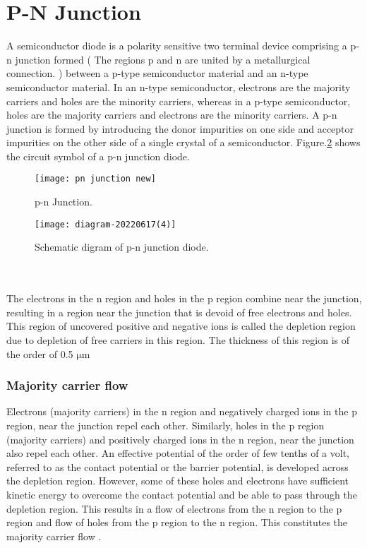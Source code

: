 \section{P-N Junction}
A semiconductor diode is a polarity sensitive two terminal device comprising a p-n junction formed ( The regions p and n are united by a metallurgical connection. ) between a p-type semiconductor material and an n-type semiconductor material. In an n-type semiconductor, electrons are the majority carriers and holes are the minority carriers, whereas in a p-type semiconductor, holes are the majority carriers and electrons are the minority carriers. A p-n junction is formed by introducing the donor impurities on one side and acceptor impurities on the other side of a single crystal of a semiconductor. Figure.\ref{Diode} shows the circuit symbol of a p-n junction diode.\\
\begin{minipage}{0.35\textwidth}
\begin{figure}[H]
	\centering
	\texttt{[image: pn junction new]}
	\caption{p-n Junction.}
	\label{}
\end{figure}
\end{minipage}\hfil
\begin{minipage}{0.55\textwidth}
	\begin{figure}[H]
		\centering
		\texttt{[image: diagram-20220617(4)]}
		\caption{Schematic digram of p-n junction diode.}
		\label{Diode}
	\end{figure}
\end{minipage}\\\\
The electrons in the n region and holes in the p region combine near the junction, resulting in a region near the junction that is devoid of free electrons and holes. This region of uncovered positive and negative ions is called the depletion region due to depletion of free carriers in
this region. The thickness of this region is of the order of 0.5 $ \mathrm{\mu m}$
\subsubsection{Majority carrier flow}
Electrons (majority carriers) in the n region and negatively charged ions in the p region, near the junction repel each other. Similarly, holes in the p region (majority carriers) and positively charged ions in the n region, near the junction also repel each other. An effective potential of the order of few tenths of a volt, referred to as the contact potential or the barrier potential, is developed across the depletion region. However, some of these holes and electrons have sufficient kinetic energy to overcome the contact potential and be able to
pass through the depletion region. This results in a flow of electrons from the n region to the p region and flow of holes from the p region to the n region. This constitutes the majority carrier flow .
